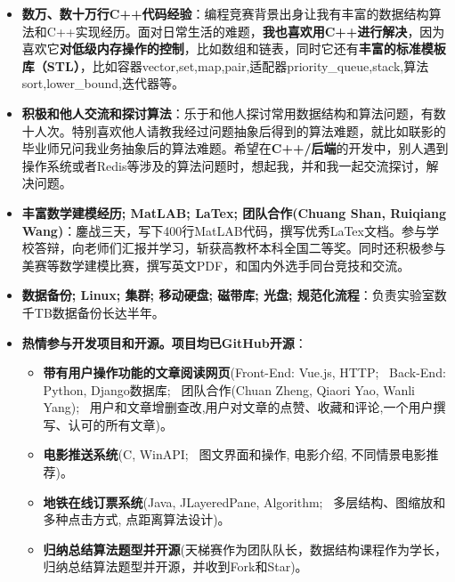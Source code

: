 \documentclass{resume}
\begin{document}
\begin{itemize}
	\item \textbf{数万、数十万行C++代码经验}：编程竞赛背景出身让我有丰富的数据结构算法和C++实现经历。面对日常生活的难题，\textbf{我也喜欢用C++进行解决}，因为喜欢它\textbf{对低级内存操作的控制}，比如数组和链表，同时它还有\textbf{丰富的标准模板库（STL）}，比如容器vector,set,map,pair,适配器priority\_queue,stack,算法sort,lower\_bound,迭代器等。
	\item \textbf{积极和他人交流和探讨算法}：乐于和他人探讨常用数据结构和算法问题，有数十人次。特别喜欢他人请教我经过问题抽象后得到的算法难题，就比如联影的毕业师兄问我业务抽象后的算法难题。希望在\textbf{C++/后端}的开发中，别人遇到操作系统或者Redis等涉及的算法问题时，想起我，并和我一起交流探讨，解决问题。
	\item \textbf{丰富数学建模经历; MatLAB; LaTex; 团队合作(Chuang Shan, Ruiqiang Wang)}：鏖战三天，写下400行MatLAB代码，撰写优秀LaTex文档。参与学校答辩，向老师们汇报并学习，斩获高教杯本科全国二等奖。同时还积极参与美赛等数学建模比赛，撰写英文PDF，和国内外选手同台竞技和交流。
	\item \textbf{数据备份; Linux; 集群; 移动硬盘; 磁带库; 光盘; 规范化流程}：负责实验室数千TB数据备份长达半年。
	\item \textbf{热情参与开发项目和开源。项目均已GitHub开源}：
		\begin{itemize}
			\item \textbf{带有用户操作功能的文章阅读网页}(Front-End: Vue.js, HTTP; \, Back-End: Python, Django数据库; \, 团队合作(Chuan Zheng, Qiaori Yao, Wanli Yang); \, 用户和文章增删查改,用户对文章的点赞、收藏和评论,一个用户撰写、认可的所有文章)。
			\item \textbf{电影推送系统}(C, WinAPI; \, 图文界面和操作, 电影介绍, 不同情景电影推荐)。
			\item \textbf{地铁在线订票系统}(Java, JLayeredPane, Algorithm; \, 多层结构、图缩放和多种点击方式, 点距离算法设计)。
			\item \textbf{归纳总结算法题型并开源}(天梯赛作为团队队长，数据结构课程作为学长，归纳总结算法题型并开源，并收到Fork和Star)。
		\end{itemize}
\end{itemize}
\end{document}
